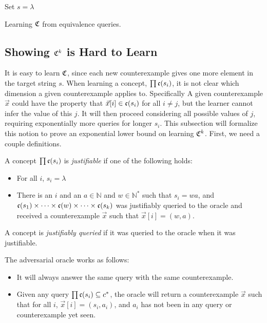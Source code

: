 \begin{algorithm}[H]
\label{ntree}
\SetAlgoLined
\KwResult{}
Set $s = \lambda$\;
\caption{Learning $\mathfrak{C}$ from equivalence queries.}
\end{algorithm}


\subsection{Showing $\mathfrak{C}^k$ is Hard to Learn}

It is easy to learn $\mathfrak{C}$, since each new counterexample gives one more element in the target string $s$. 
When learning a concept, $\prod \mathfrak{c}(s_i)$, it is not clear which dimension a given counterexample applies to. 
Specifically A given counterexample $\vec{x}$ could have the property that $\vec{x}[i] \in \mathfrak{c}(s_i)$ for all $i \ne j$, but the learner cannot infer the value of this $j$. 
It will then proceed considering all possible values of $j$, requiring exponentially more queries for longer $s_i$.  
This subsection will formalize this notion to prove an exponential lower bound on learning $\mathfrak{C}^k$. 
First, we need a couple definitions. 


A concept $\prod \mathfrak{c}(s_i)$ is \emph{justifiable} if one of the following holds:
\begin{itemize}
\item For all $i$, $s_i = \lambda$
\item There is an $i$ and an $a \in \mathbb{N}$ and $w \in \mathbb{N}^*$ such that $s_i = wa$, and $\mathfrak{c}(s_1) \times \dots \times \mathfrak{c}(w) \times \dots \times \mathfrak{c}(s_k)$  was justifiably queried to the oracle and received a counterexample $\vec{x}$ such that $\vec{x}[i] = (w, a)$. 
\end{itemize}

A concept is \emph{justifiably queried} if it was queried to the oracle when it was justifiable. 
\newline


The adversarial oracle works as follows:
\begin{itemize}
\item It will always answer the same query with the same counterexample.  
\item Given any query $\prod \mathfrak{c}(s_i) \subseteq c^*$, the oracle will return a counterexample $\vec{x}$ such that for all $i$, $\vec{x}[i] = (s_i, a_i)$, and $a_i$ has not been in any query or counterexample yet seen.
\end{itemize}

